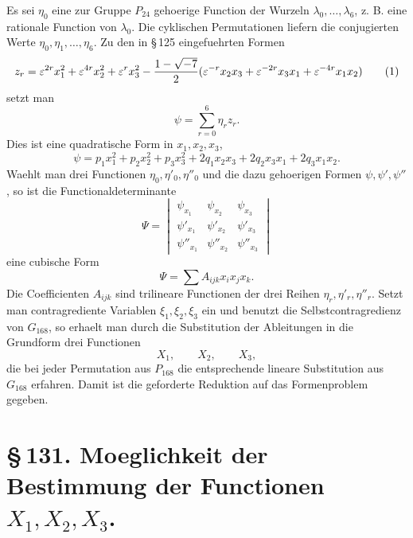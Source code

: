 \documentclass[11pt]{article}
\newcommand{\eps}{\varepsilon}
\begin{document}
Es sei \(\eta_0\) eine zur Gruppe \(P_{24}\) gehoerige Function der Wurzeln \(\lambda_0,\ldots,\lambda_6\), z. B. eine rationale Function von \(\lambda_0\). Die cyklischen Permutationen liefern die conjugierten Werte \(\eta_0,\eta_1,
\ldots,\eta_6\). Zu den in \S\,125 eingefuehrten Formen
\begin{equation}
z_r=\eps^{2r}x_1^2+\eps^{4r}x_2^2+
\eps^r x_3^2-{1-\sqrt{-7}\over2}(\eps^{-r}x_2x_3+\eps^{-2r}x_3x_1+\eps^{-4r}x_1x_2)
\tag{1}
\end{equation}
setzt man
\begin{equation}
\psi=\sum_{r=0}^6\eta_r z_r.
\tag{2}
\end{equation}
Dies ist eine quadratische Form in \(x_1,x_2,x_3\),
\begin{equation}
\psi=p_1x_1^2+p_2x_2^2+p_3x_3^2+2q_1x_2x_3+2q_2x_3x_1+2q_3x_1x_2.
\tag{3}
\end{equation}
Waehlt man drei Functionen \(\eta_0,\eta'_0,\eta''_0\) und die dazu gehoerigen Formen \(\psi,\psi',\psi''\), so ist die Functionaldeterminante
\begin{equation}
\Psi=
\begin{vmatrix}
\psi_{x_1}&\psi_{x_2}&\psi_{x_3}\\
\psi'_{x_1}&\psi'_{x_2}&\psi'_{x_3}\\
\psi''_{x_1}&\psi''_{x_2}&\psi''_{x_3}
\end{vmatrix}
\tag{4}
\end{equation}
eine cubische Form
\begin{equation}
\Psi=\sum A_{ijk}x_ix_jx_k.
\tag{5}
\end{equation}
Die Coefficienten \(A_{ijk}\) sind trilineare Functionen der drei Reihen \(\eta_r,\eta'_r,\eta''_r\). Setzt man contragrediente Variablen \(\xi_1,\xi_2,\xi_3\) ein und benutzt die Selbstcontragredienz von \(G_{168}\), so erhaelt man durch die Substitution der Ableitungen in die Grundform drei Functionen
\begin{equation}
X_1,
\qquad X_2,
\qquad X_3,
\tag{6}
\end{equation}
die bei jeder Permutation aus \(P_{168}\) die entsprechende lineare Substitution aus \(G_{168}\) erfahren. Damit ist die geforderte Reduktion auf das Formenproblem gegeben.

\section*{\S\,131. Moeglichkeit der Bestimmung der Functionen \(X_1,X_2,X_3\).}
\end{document}
